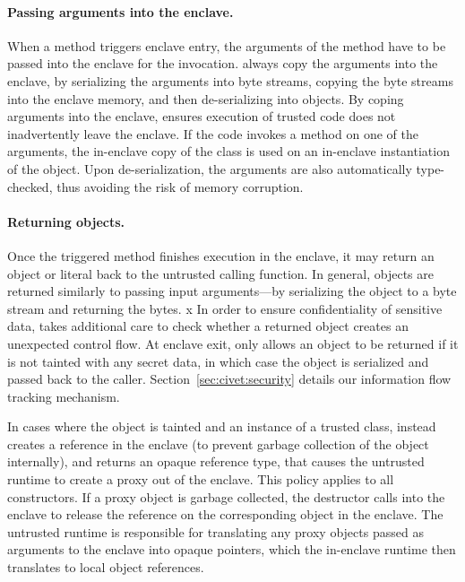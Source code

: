 \paragraph{Passing arguments into the enclave.}
When a method triggers enclave entry, the arguments of the method have to be passed into the enclave for the invocation.
\sysname{} always copy the arguments into the enclave,
by serializing the arguments into byte streams,
copying the byte streams into the enclave memory,
and then de-serializing into objects.
By coping arguments into the enclave,
\sysname{} ensures execution of trusted code does not inadvertently leave the enclave.
If the code invokes a method on one of the arguments,
the in-enclave copy of the class is used on an in-enclave instantiation of the object.
Upon de-serialization, the arguments are also automatically type-checked,
thus avoiding the risk of memory corruption.

\paragraph{Returning objects.}
Once the triggered method finishes execution in the enclave,
it may return an object or literal back to the untrusted calling function.
In general, objects are returned similarly to passing input arguments---by serializing the object to a byte stream and returning the bytes.
x
In order to ensure confidentiality of sensitive data, \sysname{} takes additional care to check
whether a returned object creates an unexpected control flow.
At enclave exit, \sysname{} only allows an object to be returned if it is not tainted with any secret data,
in which case the object is serialized and passed back to the caller.
Section~\ref{sec:civet:security} details our information flow tracking mechanism.

In cases where the object is tainted and an instance of a trusted class,
\sysname{} instead creates a reference in the enclave (to prevent garbage collection of the object internally),
and returns an opaque reference type, that causes the untrusted \sysname{} runtime to create a proxy out of the enclave.
This policy applies to all constructors.
If a proxy object is garbage collected, the destructor calls into the enclave to release the reference on the 
corresponding object in the enclave.
The \sysname{} untrusted runtime is responsible for translating any proxy objects passed as arguments to the enclave into opaque pointers,
which the in-enclave runtime then translates to local object references.

